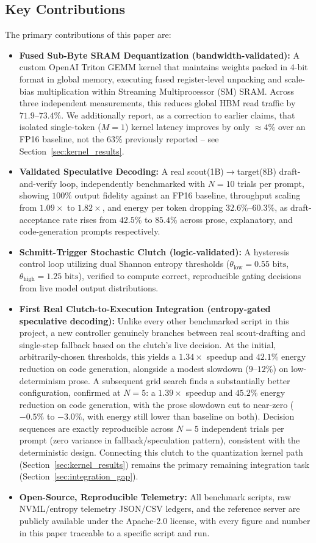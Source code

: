 \documentclass[10pt,journal,compsoc,twocolumn]{IEEEtran}
\begin{document}
\subsection{Key Contributions}
The primary contributions of this paper are:
\begin{itemize}
    \item \textbf{Fused Sub-Byte SRAM Dequantization (bandwidth-validated):} A custom OpenAI Triton GEMM kernel that maintains weights packed in 4-bit format in global memory, executing fused register-level unpacking and scale-bias multiplication within Streaming Multiprocessor (SM) SRAM. Across three independent measurements, this reduces global HBM read traffic by $71.9$--$73.4\%$. We additionally report, as a correction to earlier claims, that isolated single-token ($M=1$) kernel latency improves by only $\approx 4\%$ over an FP16 baseline, not the $63\%$ previously reported -- see Section~\ref{sec:kernel_results}.
    \item \textbf{Validated Speculative Decoding:} A real scout(1B)$\to$target(8B) draft-and-verify loop, independently benchmarked with $N{=}10$ trials per prompt, showing $100\%$ output fidelity against an FP16 baseline, throughput scaling from $1.09\times$ to $1.82\times$, and energy per token dropping $32.6\%$--$60.3\%$, as draft-acceptance rate rises from $42.5\%$ to $85.4\%$ across prose, explanatory, and code-generation prompts respectively.
    \item \textbf{Schmitt-Trigger Stochastic Clutch (logic-validated):} A hysteresis control loop utilizing dual Shannon entropy thresholds ($\theta_{\text{low}} = 0.55\text{ bits}$, $\theta_{\text{high}} = 1.25\text{ bits}$), verified to compute correct, reproducible gating decisions from live model output distributions.
    \item \textbf{First Real Clutch-to-Execution Integration (entropy-gated speculative decoding):} Unlike every other benchmarked script in this project, a new controller genuinely branches between real scout-drafting and single-step fallback based on the clutch's live decision. At the initial, arbitrarily-chosen thresholds, this yields a $1.34\times$ speedup and $42.1\%$ energy reduction on code generation, alongside a modest slowdown ($9$--$12\%$) on low-determinism prose. A subsequent grid search finds a substantially better configuration, confirmed at $N{=}5$: a $1.39\times$ speedup and $45.2\%$ energy reduction on code generation, with the prose slowdown cut to near-zero ($-0.5\%$ to $-3.0\%$, with energy still lower than baseline on both). Decision sequences are exactly reproducible across $N{=}5$ independent trials per prompt (zero variance in fallback/speculation pattern), consistent with the deterministic design. Connecting this clutch to the quantization kernel path (Section~\ref{sec:kernel_results}) remains the primary remaining integration task (Section~\ref{sec:integration_gap}).
    \item \textbf{Open-Source, Reproducible Telemetry:} All benchmark scripts, raw NVML/entropy telemetry JSON/CSV ledgers, and the reference server are publicly available under the Apache-2.0 license, with every figure and number in this paper traceable to a specific script and run.
\end{itemize}
\end{document}
